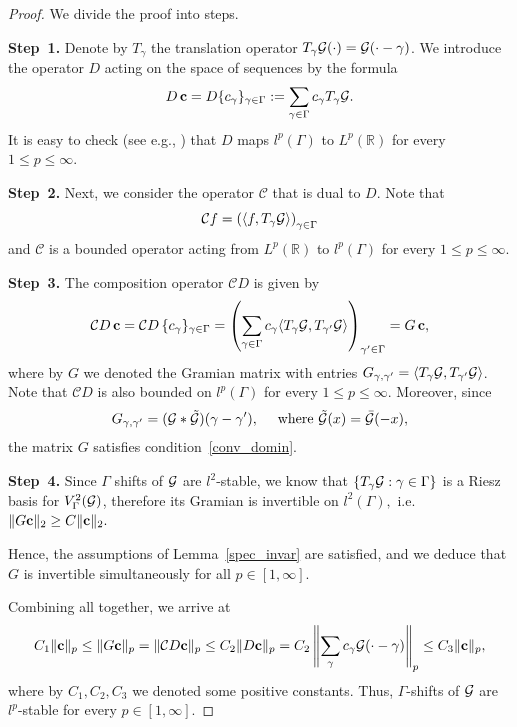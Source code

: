 \documentclass[12pt]{amsart}
\numberwithin{equation}{section}
\newcommand{\R}{{\mathbb R}} \newcommand{\Q}{{\mathbb Q}} \newcommand{\Z}{{\mathbb Z}} \newcommand{\N}{{\mathbb N}}
\begin{document}
\begin{proof}
    
We divide the proof into steps.

{\bf Step~1.} Denote by $T_{\gamma}$ the translation operator $T_{\gamma}\mathcal{G} (\cdot)= \mathcal{G}( \cdot - \gamma)$.  We introduce the operator $D$ acting on the space of sequences  by the formula
\begin{equation}
    D \, {\bf c} = D\{c_{\gamma}\}_{\gamma \in \Gamma} := \sum_{\gamma \in \Gamma} c_{\gamma} T_{\gamma} \mathcal{G}.
\end{equation}
It is easy to check (see e.g., \cite[Lemma~8.1]{uz}) that $D$ maps $l^p(\Gamma)$ to $L^p(\R)$ for every $1 \le p \le \infty.$ 


{\bf Step~2.} Next, we consider the operator $\mathcal{C}$ that is dual to $D$. Note that
$$
\mathcal{C}f = \left( \langle f, T_{\gamma } \mathcal{G}\rangle \right)_{\gamma \in \Gamma}
$$
and $\mathcal{C}$ is a bounded operator acting from $L^p(\R)$ to $l^p(\Gamma)$ for every $1 \le p \le \infty.$

{\bf Step~3.} The composition operator $\mathcal{C}D$ is given by
$$
\mathcal{C} D \, {\bf c} = \mathcal{C}D \, \{c_{\gamma}\}_{\gamma \in \Gamma} = \left( \sum\limits_{
\gamma \in \Gamma} c_{\gamma} \langle T_{\gamma} \mathcal{G}, T_{\gamma'} \mathcal{G} \rangle \right)_{\gamma' \in \Gamma} =  G \, {\bf c},
$$
where by $G$ we denoted the Gramian matrix with entries $G_{\gamma, \gamma'} = \langle T_{\gamma}\mathcal{G}, T_{\gamma'}\mathcal{G} \rangle$.
Note that $\mathcal{C} D$ is also bounded on $l^p(\Gamma)$ for every  $1 \le p \le \infty.$
Moreover, since
\begin{equation}
G_{\gamma, \gamma'} = (\mathcal{G} \ast \tilde{\mathcal{G}}) (\gamma - \gamma'), \quad \text{ where }  \tilde{\mathcal{G}}(x)=\bar{\mathcal{G}}(-x),
\end{equation}
the matrix $G$ satisfies condition~\eqref{conv_domin}.

{\bf Step~4.} Since $\Gamma$ shifts of $\mathcal{G}$ are $l^2$-stable, we know that $\{ T_{\gamma}\mathcal{G} : \gamma \in \Gamma \}$ is a Riesz basis for $V^2_{\Gamma}(\mathcal{G})$,  therefore its Gramian is invertible on $l^2(\Gamma),$ i.e. $\|G {\bf c}\|_2 \ge C\|{\bf c}\|_2.$

Hence, the assumptions of Lemma~\ref{spec_invar} are satisfied, and we deduce that $G$ is invertible simultaneously for all $p \in [1, \infty].$

Combining all together, we arrive at
$$
C_1 \|{\bf c}\|_p \le \|G {\bf c}\|_p = \|\mathcal{C}D {\bf c}\|_p \le C_2 \|D {\bf c}\|_p =C_2 \left\|\sum\limits_{\gamma} c_{\gamma} \mathcal{G}(\cdot - \gamma)\right\|_p \le C_3 \|{\bf c}\|_p, 
$$
where by $C_1, C_2, C_3$ we denoted some positive constants.
Thus, $\Gamma$-shifts of $\mathcal{G}$ are $l^p$-stable for every $p \in [1, \infty].$
\end{proof}
\end{document}
